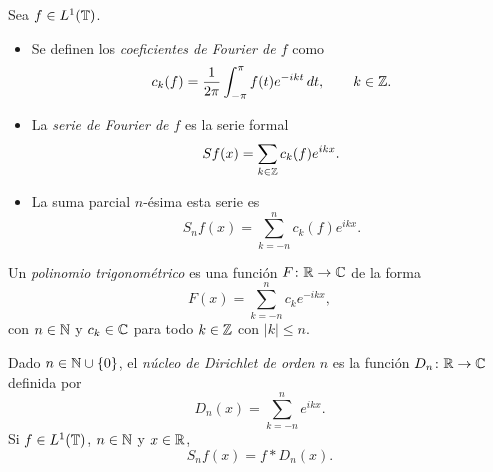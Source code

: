 \documentclass{beamer}
\begin{document}
\begin{frame}
    \begin{block}{}
        Sea $f \in L^1(\mathbb T)$.
        \begin{itemize}
            \item<1-> Se definen los \emph{coeficientes de Fourier de $f$} como
            \[c_k(f) = \frac{1}{2\pi}\int_{-\pi}^{\pi} f(t)e^{-ikt} \, dt, \qquad k \in \mathbb Z.\]
            \item<2-> La \emph{serie de Fourier de $f$} es la serie formal
            \[Sf(x) = \sum_{ k \in \mathbb Z} c_k(f)e^{ikx}.\]
            \item<3-> La suma parcial $n$-ésima esta serie es
            \[S_nf(x) = \sum_{k =-n}^n c_k(f)e^{ikx}.\]
        \end{itemize}
    \end{block}
\end{frame}

\begin{frame}
    \begin{block}{}
        Un \emph{polinomio trigonométrico} es una función $F \colon \mathbb R\to\mathbb C$ de la forma
        \[F(x) = \sum_{k=-n}^n c_ke^{-ikx},\]
        con $n\in\mathbb N$ y $c_k\in\mathbb C$ para todo $k\in\mathbb Z$ con $|k|\leq n$.
    \end{block}
    \pause
    \begin{block}{}
        Dado $n \in \mathbb N \cup \{0\}$, el \emph{núcleo de Dirichlet de orden $n$} es la función $D_n \colon \mathbb R \to \mathbb C$ definida por
        \[D_n(x) = \sum_{k=-n}^n e^{ikx}.\]
        \pause
        Si $f \in L^1(\mathbb T)$, $n \in \mathbb N$ y $x \in \mathbb R$,
        \[S_nf(x) = f \ast D_n(x).\]
    \end{block}
\end{frame}
\end{document}
